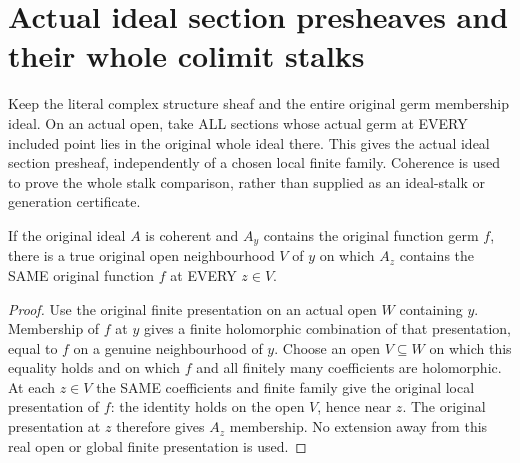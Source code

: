\section{Actual ideal section presheaves and their whole colimit stalks}

Keep the literal complex structure sheaf and the entire original germ
membership ideal. On an actual open, take ALL sections whose actual germ
at EVERY included point lies in the original whole ideal there. This gives
the actual ideal section presheaf, independently of a chosen local finite
family. Coherence is used to prove the whole stalk comparison, rather than
supplied as an ideal-stalk or generation certificate.

\begin{lemma}
\label{hir:real-domain-actual-original-coherent-membership-spread}
\leanok
If the original ideal $A$ is coherent and $A_y$ contains the original
function germ $f$, there is a true original open neighbourhood $V$ of $y$
on which $A_z$ contains the SAME original function $f$ at EVERY $z\in V$.
\end{lemma}
\begin{proof}
Use the original finite presentation on an actual open $W$ containing $y$.
Membership of $f$ at $y$ gives a finite holomorphic combination of that
presentation, equal to $f$ on a genuine neighbourhood of $y$. Choose an
open $V\subseteq W$ on which this equality holds and on which $f$ and all
finitely many coefficients are holomorphic. At each $z\in V$ the SAME
coefficients and finite family give the original local presentation of
$f$: the identity holds on the open $V$, hence near $z$. The original
presentation at $z$ therefore gives $A_z$ membership. No extension away
from this real open or global finite presentation is used.
\end{proof}

